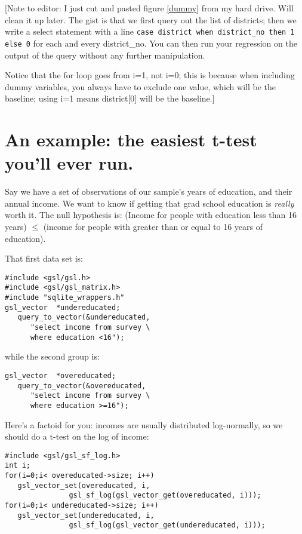 
[Note to editor: I just cut and pasted figure \ref{dummy} from my hard drive. Will clean it up
later. The gist is that we first query out the list of districts; then we write a
select statement with a line {\tt case district when district\_no then 1 else 0} for
each and every district\_no. You can then run your regression on the output of the
query without any further manipulation.

Notice that the for loop goes from i=1, not i=0; this is because when including
dummy variables, you always have to exclude one value, which will be the baseline;
using i=1 means district[0] will be the baseline.]




\section{An example: the easiest t-test you'll ever run.}
Say we have a set of observations of our sample's years of education, and their annual income. We want to
know if getting that grad school education is {\it really} worth it. The null hypothesis is: (Income for
people with education less than 16 years) $\leq$ (income for people with greater than or equal to 16 years
of education).

That first data set is:
\begin{verbatim}
#include <gsl/gsl.h>
#include <gsl/gsl_matrix.h>
#include "sqlite_wrappers.h"
gsl_vector	*undereducated;
   query_to_vector(&undereducated, 
      "select income from survey \
      where education <16");
\end{verbatim}
while the second group is:
\begin{verbatim}
gsl_vector	*overeducated;
   query_to_vector(&overeducated, 
      "select income from survey \
      where education >=16");
\end{verbatim}

Here's a factoid for you: incomes are usually distributed log-normally, so we should do a t-test on the
log of income:
\begin{verbatim}
#include <gsl/gsl_sf_log.h>
int i;
for(i=0;i< overeducated->size; i++)
   gsl_vector_set(overeducated, i, 
               gsl_sf_log(gsl_vector_get(overeducated, i)));
for(i=0;i< undereducated->size; i++)
   gsl_vector_set(undereducated, i, 
               gsl_sf_log(gsl_vector_get(undereducated, i)));
\end{verbatim}

